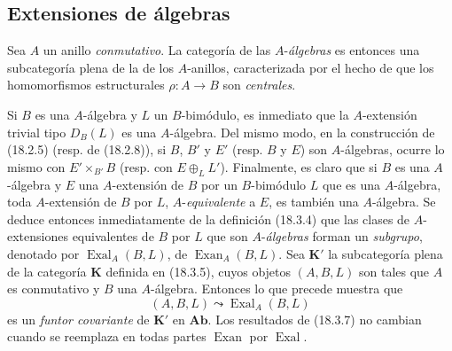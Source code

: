 \subsection{Extensiones de álgebras}
\label{subsection:0.18.4-fr}

\begin{env}[18.4.1]
\label{0.18.4.1-fr}
Sea $A$ un anillo \emph{conmutativo}. La categoría de las $A$-\emph{álgebras} es
entonces una subcategoría plena de la de los $A$-anillos, caracterizada por el
hecho de que los homomorfismos estructurales $\rho:A\to B$ son \emph{centrales}.

Si $B$ es una $A$-álgebra y $L$ un $B$-bimódulo, es inmediato que la
$A$-extensión trivial tipo $D_B(L)$ es una $A$-álgebra. Del mismo modo, en la
construcción de (18.2.5) (resp. de (18.2.8)), si $B$, $B'$ y $E'$ (resp.
$B$ y $E$) son $A$-álgebras, ocurre lo mismo con
$E'\times_{B'}B$ (resp. con $E\oplus_LL'$). Finalmente, es claro que si $B$ es
una $A$-álgebra y $E$ una $A$-extensión de $B$ por un $B$-bimódulo $L$ que
es una $A$-álgebra, toda $A$-extensión de $B$ por $L$, $A$-\emph{equivalente}
a $E$, es también una $A$-álgebra. Se deduce entonces inmediatamente de la definición
(18.3.4) que las clases de $A$-extensiones equivalentes de $B$ por $L$ que
son $A$-\emph{álgebras} forman un \emph{subgrupo}, denotado por
$\operatorname{Exal}_A(B,L)$, de $\operatorname{Exan}_A(B,L)$. Sea
$\boldsymbol{K}'$ la subcategoría plena de la categoría $\boldsymbol{K}$ definida en
(18.3.5), cuyos objetos $(A,B,L)$ son tales que $A$ es conmutativo y $B$
una $A$-álgebra. Entonces lo que precede muestra que
\[
  (A,B,L)\leadsto\operatorname{Exal}_A(B,L)
\]
es un \emph{funtor covariante} de $\boldsymbol{K}'$ en $\boldsymbol{Ab}$. Los
resultados de (18.3.7) no cambian cuando se reemplaza en todas partes
$\operatorname{Exan}$ por $\operatorname{Exal}$.
\end{env}

